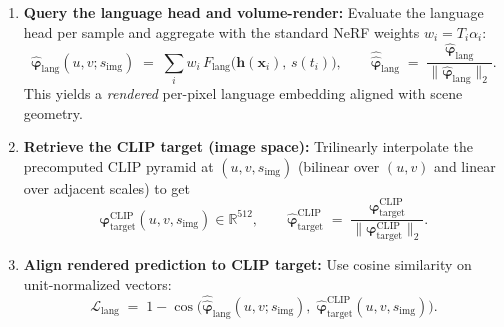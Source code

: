\begin{enrichment}
\begin{enrichment}
\begin{enumerate}
            \item \textbf{Query the language head and volume-render:} Evaluate the language head per sample and aggregate with the standard NeRF weights $w_i=T_i\alpha_i$:
            \[
            \hat{\boldsymbol{\varphi}}_{\text{lang}}(u,v; s_{\text{img}})
            \;=\;
            \sum_i w_i\,F_{\text{lang}}\!\big(\mathbf{h}(\mathbf{x}_i),\,s(t_i)\big),
            \qquad
            \widehat{\hat{\boldsymbol{\varphi}}}_{\text{lang}}
            \;=\;
            \frac{\hat{\boldsymbol{\varphi}}_{\text{lang}}}{\big\|\hat{\boldsymbol{\varphi}}_{\text{lang}}\big\|_2}.
            \]
            This yields a \emph{rendered} per-pixel language embedding aligned with scene geometry.
            
            \item \textbf{Retrieve the CLIP target (image space):} Trilinearly interpolate the precomputed CLIP pyramid at $(u,v,s_{\text{img}})$ (bilinear over $(u,v)$ and linear over adjacent scales) to get
            \[
            \boldsymbol{\varphi}^{\text{CLIP}}_{\text{target}}(u,v,s_{\text{img}})\in\mathbb{R}^{512}, 
            \qquad
            \widehat{\boldsymbol{\varphi}}^{\text{CLIP}}_{\text{target}}
            \;=\;
            \frac{\boldsymbol{\varphi}^{\text{CLIP}}_{\text{target}}}{\big\|\boldsymbol{\varphi}^{\text{CLIP}}_{\text{target}}\big\|_2}.
            \]
            
            \item \textbf{Align rendered prediction to CLIP target:} Use cosine similarity on unit-normalized vectors:
            \[
            \mathcal{L}_{\text{lang}}
            \;=\;
            1 - \cos\!\Big(
            \widehat{\hat{\boldsymbol{\varphi}}}_{\text{lang}}(u,v; s_{\text{img}}),\;
            \widehat{\boldsymbol{\varphi}}^{\text{CLIP}}_{\text{target}}(u,v,s_{\text{img}})
            \Big).
            \]
        \end{enumerate}
        

\end{enrichment}
\end{enrichment}
